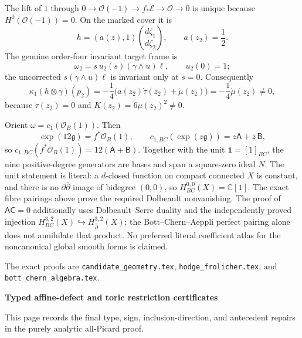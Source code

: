 {\ResultSmall
The lift of \(1\) through
\(0\to\mathcal O(-1)\to f_*\mathcal E\to\mathcal O\to0\) is unique because
\(H^0(\mathcal O(-1))=0\).  On the marked cover it is
\[
 h=(a(z),1)\binom{d\zeta_1}{d\zeta_2},\qquad a(z_2)=\frac12.
\]
The genuine order-four invariant target frame is
\[
 \omega_2=s\,u_2(s)(\gamma\wedge u)\ell,\qquad u_2(0)=1;
\]
the uncorrected \(s(\gamma\wedge u)\ell\) is invariant only at \(s=0\).
Consequently
\[
 \kappa_1(h\otimes\gamma)(p_2)
 =-\frac14\bigl(a(z_2)\dot\tau(z_2)+\dot\mu(z_2)\bigr)
 =-\frac14\dot\mu(z_2)\ne0,
\]
because \(\dot\tau(z_2)=0\) and
\(K(z_2)=6\dot\mu(z_2)^2\ne0\).
}

{\ResultSmall
Orient \(\omega=c_1(\mathcal O_B(1))\).  Then
\[
 \exp(12\mathfrak g)=f^*\mathcal O_B(1),\qquad
 c_{1,BC}(\exp(z\mathfrak g))=z\mathsf A+\bar z\,\mathsf B,
\]
so \(c_{1,BC}(f^*\mathcal O_B(1))=12(\mathsf A+\mathsf B)\).
Together with the unit \(\mathbf1=[1]_{BC}\), the nine positive-degree
generators are bases and span a square-zero ideal \(N\).  The unit statement
is literal: a \(d\)-closed function on compact connected \(X\) is constant,
and there is no \(\partial\bar\partial\) image of bidegree \((0,0)\), so
\(H^{0,0}_{BC}(X)=\mathbb C[1]\).  The exact fibre
pairings above prove the required Dolbeault nonvanishing.  The proof of
\(\mathsf A\mathsf C=0\) additionally uses Dolbeault--Serre duality and the
independently proved injection
\(H^{3,2}_{BC}(X)\hookrightarrow H^{3,2}_{\bar\partial}(X)\); the
Bott--Chern--Aeppli perfect pairing alone does not annihilate that product.
No preferred literal coefficient atlas for the noncanonical global smooth
forms is claimed.
}

\vfill
{\fontsize{6.25pt}{7.1pt}\selectfont\color{AuditProvenance}
The exact proofs are
\texttt{candidate\_geometry.tex}, \texttt{hodge\_frolicher.tex}, and
\texttt{bott\_chern\_algebra.tex}.}
\endgroup

\newpage
\thispagestyle{empty}
\begingroup
\raggedright
\setlength{\parindent}{0pt}
\setlength{\parskip}{0pt}
\setlength{\fboxsep}{5pt}
\newcommand{\ResultHead}[1]{\par\vspace{2.7pt}{\fontsize{8.4pt}{9.25pt}\selectfont\bfseries\color{AuditReviewed}#1}\par\vspace{0.8pt}}
\newcommand{\ResultSmall}{\fontsize{7.05pt}{8.05pt}\selectfont}

{\fontsize{14.6pt}{16pt}\selectfont\bfseries Typed affine-defect and toric restriction certificates}
\par\vspace{1pt}
{\fontsize{6.8pt}{7.75pt}\selectfont\color{AuditProvenance}
This page records the final type, sign, inclusion-direction, and antecedent
repairs in the purely analytic all-Picard proof.}


